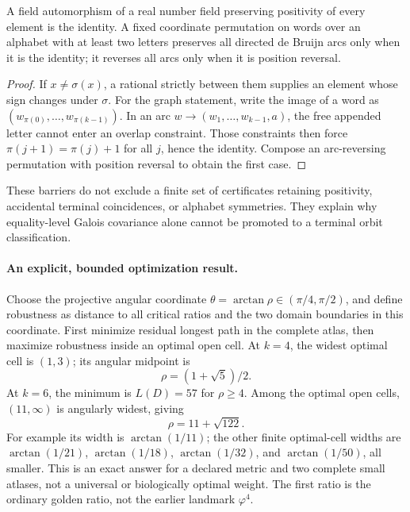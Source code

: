 \begin{proposition}
A field automorphism of a real number field preserving positivity of every element is the identity. A fixed coordinate permutation on words over an alphabet with at least two letters preserves all directed de Bruijn arcs only when it is the identity; it reverses all arcs only when it is position reversal.
\end{proposition}
\begin{proof}
If $x\ne\sigma(x)$, a rational strictly between them supplies an element whose sign changes under $\sigma$. For the graph statement, write the image of a word as $(w_{\pi(0)},\ldots,w_{\pi(k-1)})$. In an arc $w\to(w_1,\ldots,w_{k-1},a)$, the free appended letter cannot enter an overlap constraint. Those constraints then force $\pi(j+1)=\pi(j)+1$ for all $j$, hence the identity. Compose an arc-reversing permutation with position reversal to obtain the first case.
\end{proof}
These barriers do not exclude a finite set of certificates retaining positivity, accidental terminal coincidences, or alphabet symmetries. They explain why equality-level Galois covariance alone cannot be promoted to a terminal orbit classification.

\paragraph{An explicit, bounded optimization result.}
Choose the projective angular coordinate $\theta=\arctan\rho\in(\pi/4,\pi/2)$, and define robustness as distance to all critical ratios and the two domain boundaries in this coordinate. First minimize residual longest path in the complete atlas, then maximize robustness inside an optimal open cell. At $k=4$, the widest optimal cell is $(1,3)$; its angular midpoint is
\[
\rho=(1+\sqrt5)/2.
\]
At $k=6$, the minimum is $L(D)=57$ for $\rho\ge4$. Among the optimal open cells, $(11,\infty)$ is angularly widest, giving
\[
\rho=11+\sqrt{122}.
\]
For example its width is $\arctan(1/11)$; the other finite optimal-cell widths are $\arctan(1/21)$, $\arctan(1/18)$, $\arctan(1/32)$, and $\arctan(1/50)$, all smaller. This is an exact answer for a declared metric and two complete small atlases, not a universal or biologically optimal weight. The first ratio is the ordinary golden ratio, not the earlier landmark $\varphi^4$.
